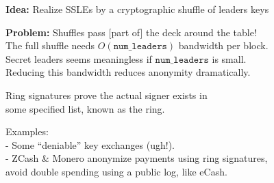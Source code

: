 \documentclass{beamer}
\def\comring{\ensuremath{\mathsf{comring}}\xspace}
\begin{document}
\begin{frame}

{\bf Idea:}  Realize SSLEs by a cryptographic shuffle of leaders keys

\bigskip\medskip

{\bf Problem:} Shuffles pass [part of] the deck around the table! \\ \medskip
\hspace{5pt}  The full shuffle needs $O(\mathtt{num\_leaders})$ bandwidth per block. \\ \smallskip
\hspace{5pt}  Secret leaders seems meaningless if $\mathtt{num\_leaders}$ is small. \\ \smallskip
\hspace{5pt}  Reducing this bandwidth reduces anonymity dramatically. \\ \smallskip



\end{frame}



\begin{frame}%

Ring signatures prove the actual signer exists in \\
\hspace{10pt} some specified list, known as the ring.

\bigskip\bigskip

Examples: \\
- Some ``deniable'' key exchanges (ugh!). \\
- ZCash \& Monero anonymize payments using ring signatures, \\
\hspace{10pt} avoid double spending using a public log, like eCash.


\end{frame}
\end{document}
